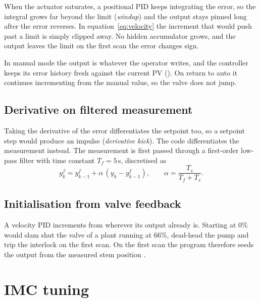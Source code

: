 \begin{theory}
When the actuator saturates, a positional PID keeps integrating the error, so
the integral grows far beyond the limit (\emph{windup}) and the output stays
pinned long after the error reverses. In equation~\eqref{eq:velocity} the
increment that would push past a limit is simply clipped away. No hidden
accumulator grows, and the output leaves the limit on the first scan the
error changes sign.
\end{theory}

\begin{theory}
In manual mode the output is whatever the operator writes, and the controller
keeps its error history fresh against the current PV (). On
return to auto it continues incrementing from the manual value, so the valve
does not jump.
\end{theory}

\subsection{Derivative on filtered measurement}

Taking the derivative of the error differentiates the setpoint too, so a
setpoint step would produce an impulse (\emph{derivative kick}). The code
differentiates the measurement instead. The measurement is first passed
through a first-order low-pass filter with time constant $T_f = 5$\,s,
discretised as
\begin{equation}
  y^f_k = y^f_{k-1} + \alpha\,(y_k - y^f_{k-1}),
  \qquad \alpha = \frac{T_s}{T_f + T_s}.
\end{equation}

\subsection{Initialisation from valve feedback}

A velocity PID increments from wherever its output already is. Starting at
0\% would slam shut the valve of a plant running at 66\%, dead-head the pump
and trip the interlock on the first scan. On the first scan the program
therefore seeds the output from the measured stem position .

\section{IMC tuning}
\label{sec:imc}

